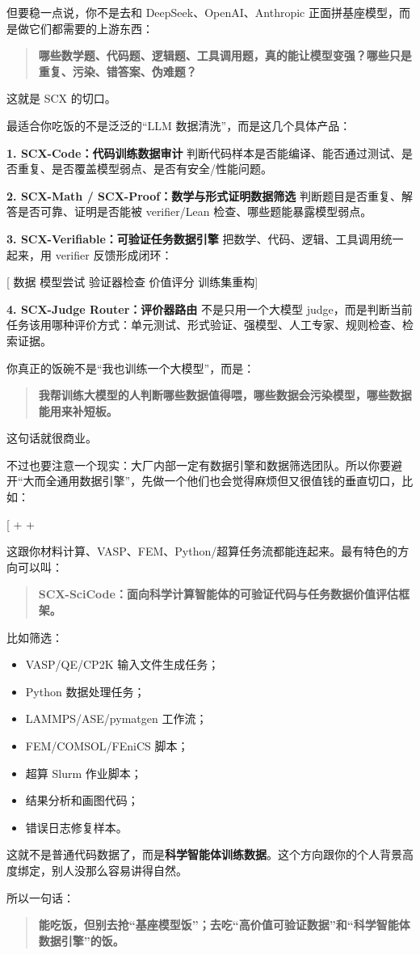 \documentclass[
  12pt,
]{ctexart}
\providecommand{\tightlist}{%
  \setlength{\itemsep}{0pt}\setlength{\parskip}{0pt}}
\begin{document}
但要稳一点说，你不是去和 DeepSeek、OpenAI、Anthropic
正面拼基座模型，而是做它们都需要的上游东西：

\begin{quote}
\textbf{哪些数学题、代码题、逻辑题、工具调用题，真的能让模型变强？哪些只是重复、污染、错答案、伪难题？}
\end{quote}

这就是 SCX 的切口。

最适合你吃饭的不是泛泛的``LLM 数据清洗''，而是这几个具体产品：

\textbf{1. SCX-Code：代码训练数据审计}
判断代码样本是否能编译、能否通过测试、是否重复、是否覆盖模型弱点、是否有安全/性能问题。

\textbf{2. SCX-Math / SCX-Proof：数学与形式证明数据筛选}
判断题目是否重复、解答是否可靠、证明是否能被 verifier/Lean
检查、哪些题能暴露模型弱点。

\textbf{3. SCX-Verifiable：可验证任务数据引擎}
把数学、代码、逻辑、工具调用统一起来，用 verifier 反馈形成闭环：

{[} 数据 \rightarrow 模型尝试 \rightarrow 验证器检查
\rightarrow 价值评分 \rightarrow 训练集重构{]}

\textbf{4. SCX-Judge Router：评价器路由} 不是只用一个大模型
judge，而是判断当前任务该用哪种评价方式：单元测试、形式验证、强模型、人工专家、规则检查、检索证据。

你真正的饭碗不是``我也训练一个大模型''，而是：

\begin{quote}
\textbf{我帮训练大模型的人判断哪些数据值得喂，哪些数据会污染模型，哪些数据能用来补短板。}
\end{quote}

这句话就很商业。

不过也要注意一个现实：大厂内部一定有数据引擎和数据筛选团队。所以你要避开``大而全通用数据引擎''，先做一个他们也会觉得麻烦但又很值钱的垂直切口，比如：

{[}  +  +
\text{科学计算代码数据}{]}

这跟你材料计算、VASP、FEM、Python/超算任务流都能连起来。最有特色的方向可以叫：

\begin{quote}
\textbf{SCX-SciCode：面向科学计算智能体的可验证代码与任务数据价值评估框架。}
\end{quote}

比如筛选：

\begin{itemize}
\tightlist
\item
  VASP/QE/CP2K 输入文件生成任务；
\item
  Python 数据处理任务；
\item
  LAMMPS/ASE/pymatgen 工作流；
\item
  FEM/COMSOL/FEniCS 脚本；
\item
  超算 Slurm 作业脚本；
\item
  结果分析和画图代码；
\item
  错误日志修复样本。
\end{itemize}

这就不是普通代码数据了，而是\textbf{科学智能体训练数据}。这个方向跟你的个人背景高度绑定，别人没那么容易讲得自然。

所以一句话：

\begin{quote}
\textbf{能吃饭，但别去抢``基座模型饭''；去吃``高价值可验证数据''和``科学智能体数据引擎''的饭。}
\end{quote}
\end{document}

